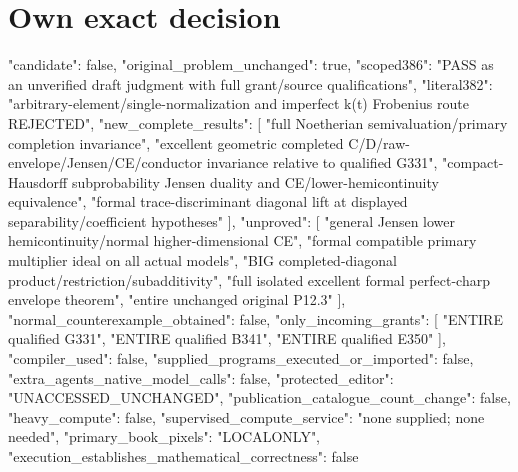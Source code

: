 \documentclass[11pt]{article}
\begin{document}
\section{Own exact decision}
\begin{QualifiedData}
{
  "candidate": false,
  "original_problem_unchanged": true,
  "scoped386": "PASS as an unverified draft judgment with full grant/source qualifications",
  "literal382": "arbitrary-element/single-normalization and imperfect k(t) Frobenius route REJECTED",
  "new_complete_results": [
    "full Noetherian semivaluation/primary completion invariance",
    "excellent geometric completed C/D/raw-envelope/Jensen/CE/conductor invariance relative to qualified G331",
    "compact-Hausdorff subprobability Jensen duality and CE/lower-hemicontinuity equivalence",
    "formal trace-discriminant diagonal lift at displayed separability/coefficient hypotheses"
  ],
  "unproved": [
    "general Jensen lower hemicontinuity/normal higher-dimensional CE",
    "formal compatible primary multiplier ideal on all actual models",
    "BIG completed-diagonal product/restriction/subadditivity",
    "full isolated excellent formal perfect-charp envelope theorem",
    "entire unchanged original P12.3"
  ],
  "normal_counterexample_obtained": false,
  "only_incoming_grants": [
    "ENTIRE qualified G331",
    "ENTIRE qualified B341",
    "ENTIRE qualified E350"
  ],
  "compiler_used": false,
  "supplied_programs_executed_or_imported": false,
  "extra_agents_native_model_calls": false,
  "protected_editor": "UNACCESSED_UNCHANGED",
  "publication_catalogue_count_change": false,
  "heavy_compute": false,
  "supervised_compute_service": "none supplied; none needed",
  "primary_book_pixels": "LOCALONLY",
  "execution_establishes_mathematical_correctness": false
}
\end{QualifiedData}
\end{document}
